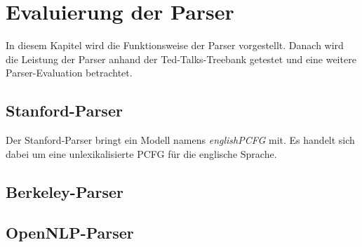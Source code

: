 %
\chapter{Evaluierung der Parser}
\label{sec:eval}

In diesem Kapitel wird die Funktionsweise der Parser vorgestellt. Danach wird die Leistung der Parser anhand der Ted-Talks-Treebank getestet und eine weitere Parser-Evaluation betrachtet.


\section{Stanford-Parser}
Der Stanford-Parser bringt ein Modell namens \textit{englishPCFG} mit. Es handelt sich dabei um eine unlexikalisierte PCFG für die englische Sprache. 
\section{Berkeley-Parser}

\section{OpenNLP-Parser}


